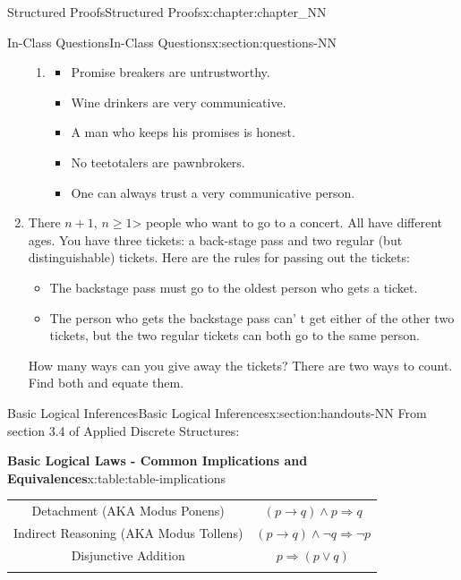 \documentclass[oneside,10pt,]{book}
\newcommand{\tabularfont}{\relax}
\numberwithin{equation}{section}
\newcommand{\hrulemedium}{\noalign{\hrule height 0.07em}}
\begin{document}
\begin{chapterptx}{Structured Proofs}{}{Structured Proofs}{}{}{x:chapter:chapter_NN}
\begin{sectionptx}{In-Class Questions}{}{In-Class Questions}{}{}{x:section:questions-NN}
\begin{enumerate}[label=\arabic*.]
\begin{enumerate}[label=(\alph*)]
%
\item{}%
\begin{itemize}[label=\textbullet]
\item{}Promise breakers are untrustworthy.%
\item{}Wine drinkers are very communicative.%
\item{}A man who keeps his promises is honest.%
\item{}No teetotalers are pawnbrokers.%
\item{}One can always trust a very communicative person.%
\end{itemize}
%
\end{enumerate}
%
\item{}There \(n+1\), \(n\ge 1\)\textgreater{} people who want to go to a concert.  All have different ages. You have three tickets: a back-stage pass and two regular (but distinguishable) tickets. Here are the rules for passing out the tickets:%
\begin{itemize}[label=\textbullet]
\item{}The backstage pass must go to the oldest person who gets a ticket.%
\item{}The person who gets the backstage pass can' t get either of the other two tickets, but the two regular tickets can both go to the same person.%
\end{itemize}
How many ways can you give away the tickets? There are two ways to count. Find both and equate them.%
\end{enumerate}
%
\end{sectionptx}
%
%
\typeout{************************************************}
\typeout{************************************************}
%
\begin{sectionptx}{Basic Logical Inferences}{}{Basic Logical Inferences}{}{}{x:section:handouts-NN}
From section 3.4 of Applied Discrete Structures:%
\begin{tableptx}{\textbf{Basic Logical Laws - Common Implications and Equivalences}}{x:table:table-implications}{}%
\centering
{}%
%
%
%
{\tabularfont%
\begin{tabular}{cc}
Detachment (AKA Modus Ponens)&\((p \rightarrow  q) \land  p\Rightarrow  q\)\tabularnewline\hrulemedium
Indirect Reasoning (AKA Modus Tollens)&\((p \to  q) \land  \neg q \Rightarrow  \neg p\)\tabularnewline\hrulemedium
Disjunctive Addition&\(p\Rightarrow (p\lor q)\)\tabularnewline\hrulemedium

\end{tabular}}
\end{tableptx}
\end{sectionptx}
\end{chapterptx}
\end{document}
